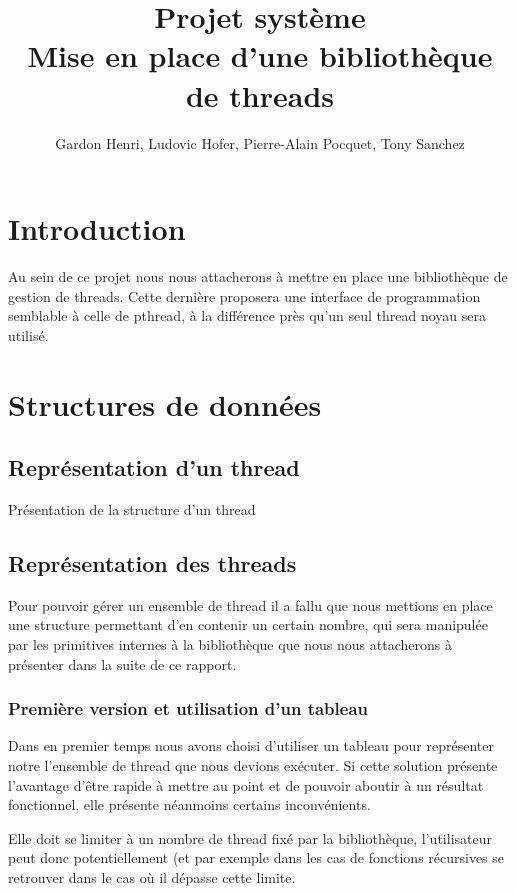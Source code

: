 \documentclass{article}
\title{Projet système \\
Mise en place d'une bibliothèque de threads}
\author{Gardon Henri, Ludovic Hofer, Pierre-Alain Pocquet, Tony Sanchez}
\begin{document}
	\maketitle
	\newpage
	\tableofcontents
	\newpage

	\section{Introduction}
	
	Au sein de ce projet nous nous attacherons à mettre en place une bibliothèque de gestion de threads. Cette dernière proposera une interface de programmation semblable à celle de pthread, à la différence près qu'un seul thread noyau sera utilisé.

	\section{Structures de données}

		\subsection{Représentation d'un thread}
		Présentation de la structure d'un thread
		

		\subsection{Représentation des threads}
		Pour pouvoir gérer un ensemble de thread il a fallu que nous mettions en place une structure permettant d'en contenir un certain nombre, qui sera manipulée par les primitives internes à la bibliothèque que nous nous attacherons à présenter dans la suite de ce rapport.

			\subsubsection{Première version et utilisation d'un tableau}
			Dans en premier temps nous avons choisi d'utiliser un tableau pour représenter notre l'ensemble de thread que nous devions exécuter.
			Si cette solution présente l'avantage d'être rapide à mettre au point et de pouvoir aboutir à un résultat fonctionnel, elle présente néanmoins certains inconvénients.
			
			Elle doit se limiter à un nombre de thread fixé par la bibliothèque, l'utilisateur peut donc potentiellement (et par exemple dans les cas de fonctions récursives se retrouver dans le cas où il dépasse cette limite.
			
\end{document}
